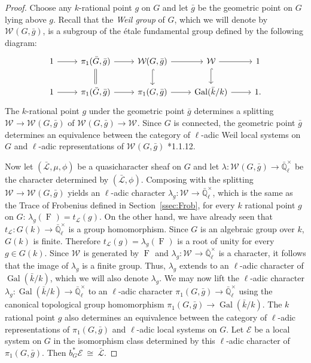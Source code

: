 \documentclass[10pt]{amsart}
\theoremstyle{plain}
\theoremstyle{definition}
\theoremstyle{remark}
\newcommand{\EE}{\mathbb{\bar Q}_\ell}
\newcommand{\bFq}{\bar{k}}
\newcommand{\Fq}{k}
\newcommand{\EEx}{\EE^\times}
\newcommand{\Weil}[1]{\mathcal{W}_{#1}}
\DeclareMathOperator{\Gal}{Gal}
\newcommand{\Frob}[1]{\operatorname{F}_{#1}}
\newcommand{\iso}{{\ \cong\ }}
\newcommand{\trFrob}[1]{t_{#1}}
\newcommand{\qcs}[1]{{\mathcal{#1}}}
\newcommand{\gqcs}[1]{{\mathcal{\bar #1}}}
\newcommand{\bg}{\bar{g}}
\newcommand{\bG}{\bar{G}}
\begin{document}
\begin{proof}
Choose any $\Fq$-rational point $g$ on $G$ and let $\bg$ be the geometric point on $G$ lying above $g$.
Recall that the \emph{Weil group} of $G$, which we will denote by $\Weil{}(G,\bg)$, is a subgroup of the \'etale
fundamental group defined by the following diagram:
\[
 \begin{tikzcd}
 1 \rar & \ar[equal]{d} \pi_1(\bG, \bg) \rar & \Weil{}(G,\bg) \rar \dar[hook] & \Weil{} \rar \dar[hook] & 1 \\
 1 \rar &  \pi_1(\bG, \bg) \rar & \pi_1(G,\bg) \rar & \Gal(\bFq/\Fq) \rar & 1.
 \end{tikzcd}
\]
The $\Fq$-rational point $g$ under the geometric point $\bg$ determines a splitting
$\Weil{}\to \Weil{}(G,\bg)$ of $\Weil{}(G,\bg)\to \Weil{}$.
%
  Since $G$ is connected, the geometric point $\bg$ determines
  an equivalence between the category of $\ell$-adic Weil local systems on $G$ and
  $\ell$-adic representations of $\Weil{}(G,\bg)$ \cite{deligne:80a}*{1.1.12}.
  
  Now let $(\gqcs{L},\mu,\phi)$ be a quasicharacter sheaf on $G$
  and let $\lambda : \Weil{}(G, \bg) \to \EEx$ be the character determined by $(\gqcs{L},\phi)$.
  Composing with the splitting $\Weil{} \to \Weil{}(G,\bg)$ yields an $\ell$-adic character
  $\lambda_g : \Weil{} \to \EEx$, which is the same as the Trace of Frobenius defined in Section~\ref{ssec:Frob}, for every $\Fq$ rational point $g$ on $G$:
  $
  \lambda_g(\Frob{}) =  \trFrob{\qcs{L}}(g).
  $
%
  On the other hand, we have already seen that $\trFrob{\qcs{L}} : G(\Fq) \to \EEx$
  is a group homomorphism. 
  Since $G$ is an algebraic group over $\Fq$, $G(\Fq)$ is finite.
  Therefore $\trFrob{\qcs{L}}(g) = \lambda_g(\Frob{})$ is a root of unity
  for every $g\in G(\Fq)$.  Since $\Weil{}$ is generated by
  $\Frob{}$ and $\lambda_g : \Weil{} \to \EEx$ is
  a character, it follows that the image of $\lambda_g$ is a finite group.
  Thus, $\lambda_g$ extends to an $\ell$-adic character of $\Gal(\bFq/\Fq)$,
  which we will also denote $\lambda_g$.
%
  We may now lift the $\ell$-adic character $\lambda_g : \Gal(\bFq/\Fq) \to \EEx$
  to an $\ell$-adic character $\pi_1(G,\bg) \to \EEx$ using the canonical topological group homomorphism
  $\pi_1(G,\bg) \to \Gal(\bFq/\Fq)$. 
  The $\Fq$ rational point $g$ also
  determines an equivalence between the category of $\ell$-adic
  representations of $\pi_1(G,\bg)$ and $\ell$-adic local systems on $G$. Let
  $\qcs{E}$ be a local system on $G$ in the isomorphism class
  determined by this $\ell$-adic character of $\pi_1(G,\bg)$.
  Then $b_G^*\qcs{E} \iso \gqcs{L}$.
  

\end{proof}
\end{document}
